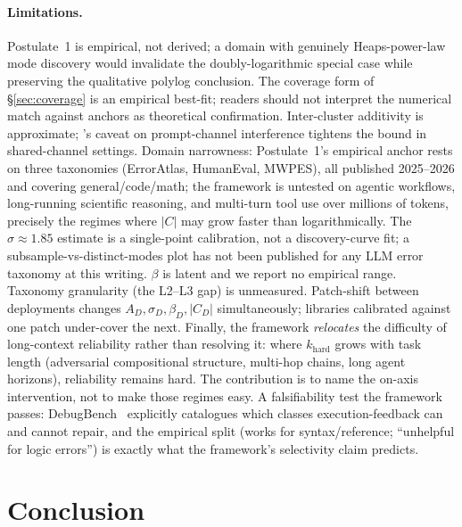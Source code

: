 \documentclass{article}
\theoremstyle{taeplain}
\theoremstyle{taedefn}
\newcommand{\teApprox}{\ensuremath{\approx}}
\begin{document}
\paragraph{Limitations.}
\label{sec:limitations}
Postulate~1 is empirical, not derived; a domain with genuinely Heaps-power-law mode discovery would invalidate the doubly-logarithmic special case while preserving the qualitative polylog conclusion. The coverage form of \S\ref{sec:coverage} is an empirical best-fit; readers should not interpret the numerical match against anchors as theoretical confirmation. Inter-cluster additivity is approximate; \citet{le2026interaction}'s caveat on prompt-channel interference tightens the bound in shared-channel settings. Domain narrowness: Postulate~1's empirical anchor rests on three taxonomies (ErrorAtlas, HumanEval, MWPES), all published 2025--2026 and covering general/code/math; the framework is untested on agentic workflows, long-running scientific reasoning, and multi-turn tool use over millions of tokens, precisely the regimes where $|C|$ may grow faster than logarithmically. The $\sigma \teApprox 1.85$ estimate is a single-point calibration, not a discovery-curve fit; a subsample-vs-distinct-modes plot has not been published for any LLM error taxonomy at this writing. $\beta$ is latent and we report no empirical range. Taxonomy granularity (the L2--L3 gap) is unmeasured. Patch-shift between deployments changes $A_D, \sigma_D, \beta_D, |C_D|$ simultaneously; libraries calibrated against one patch under-cover the next. Finally, the framework \emph{relocates} the difficulty of long-context reliability rather than resolving it: where $k_{\text{hard}}$ grows with task length (adversarial compositional structure, multi-hop chains, long agent horizons), reliability remains hard. The contribution is to name the on-axis intervention, not to make those regimes easy. A falsifiability test the framework passes: DebugBench~\citep{tian2024debugbench} explicitly catalogues which classes execution-feedback can and cannot repair, and the empirical split (works for syntax/reference; ``unhelpful for logic errors'') is exactly what the framework's selectivity claim predicts.

\section{Conclusion}
\label{sec:conclusion}
\end{document}
